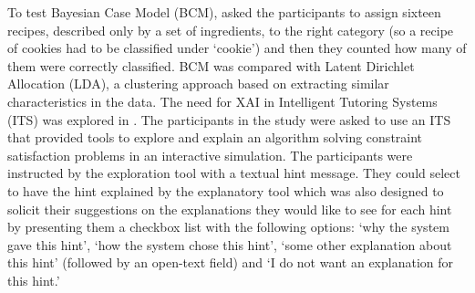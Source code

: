 \documentclass[final,1p,times]{elsarticle}
\begin{document}
To test Bayesian Case Model (BCM), \cite{kim2014bayesian} asked the participants to assign sixteen recipes, described only by a set of ingredients, to the right category (so a recipe of cookies had to be classified under `cookie') and then they counted how many of them were correctly classified. BCM was compared with Latent Dirichlet Allocation (LDA), a clustering approach based on extracting similar characteristics in the data.
The need for XAI in Intelligent Tutoring Systems (ITS) was explored in \cite{putnam2019exploring}. The participants in the study were asked to use an ITS that provided tools to explore and explain an algorithm solving constraint satisfaction problems in an interactive simulation. The participants were instructed by the exploration tool with a textual hint message. They could select to have the hint explained by the explanatory tool which was also designed to solicit their suggestions on the explanations they would like to see for each hint by presenting them a checkbox list with the following options: `why the system gave this hint', `how the system chose this hint', `some other explanation about this hint' (followed by an open-text field) and `I do not want an explanation for this hint.'\\
\end{document}
